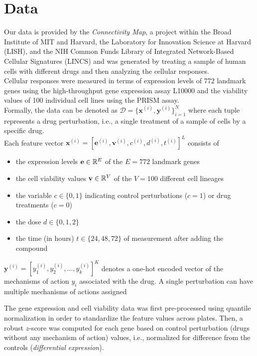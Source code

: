 \documentclass[bsc,frontabs,twoside,singlespacing,parskip,deptreport]{infthesis}     %
\let\Oldsection\section
\renewcommand{\section}{\FloatBarrier\Oldsection}
\begin{document}
\section{Data}
Our data is provided by the \textit{Connectivity Map}, a project within the Broad Institute of MIT and Harvard, the Laboratory for Innovation Science at Harvard (LISH), and the NIH Common Funds Library of Integrated Network-Based Cellular Signatures (LINCS) and was generated by treating a sample of human cells with different drugs and then analyzing the cellular responses. \\ Cellular responses were measured in terms of expression levels of 772 landmark genes using the high-throughput gene expression assay L10000 and the viability values of 100 individual cell lines using the PRISM assay.\\
Formally, the data can be denoted as \(\mathscr{D}=\{\mathbf{x}^{(i)},\mathbf{y}^{(i)}\}_{i=1}^{N}\) where each tuple represents a drug perturbation, i.e., a single treatment of a sample of cells by a specific drug.
\\ Each feature vector \(\mathbf{x}^{(i)}=[\mathbf{e}^{(i)},\mathbf{v}^{(i)}, c^{(i)},d^{(i)},t^{(i)}]^{L}\) consists of 
\begin{itemize}
    \item the expression levels \(\bf{e} \in \mathbb{R}^\mathnormal{E}\) of the \(E=772\) landmark genes
    \item the cell viability values \(\bf{v} \in \mathbb{R}^\mathnormal{V}\) of the \(V=100\) different cell lineages
    \item the variable \(c \in \{0,1\}\) indicating control perturbations (\(c=1\)) or drug treatments (\(c=0\))
    \item the dose \(d \in \{0,1,2\}\)
    \item the time (in hours) \(t \in \{24,48,72\}\) of measurement after adding the compound
    
\end{itemize}

\(\mathbf{y}^{(i)}=[y_{1}^{(i)},y_{2}^{(i)},\ldots, y_{k}^{(i)}]^{K}\) denotes a one-hot encoded vector of the mechanisms of action \(y_{i}\) associated with the drug. A single perturbation can have multiple mechanisms of actions assigned


The gene expression and cell viability data was first pre-processed using quantile normalization in order to standardize the feature values across plates. Then, a robust \(z\)-score was computed for each gene based on control perturbation (drugs without any mechanism of action) values, i.e., normalized for difference from the controls (\textit{differential expression}).
\end{document}
